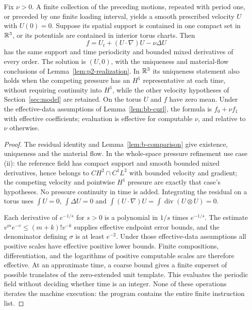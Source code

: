 \begin{proposition}
\label{prop:bb-realization}
Fix $\nu>0$.  A finite collection of the preceding motions, repeated
with period one, or preceded by one finite loading interval, yields a
smooth prescribed velocity $U$ with $U(0)=0$.  Suppose its spatial
support is contained in one compact set in $\mathbb R^3$, or its potentials
are contained in interior torus charts.  Then
\begin{equation}\label{eq:bb-residual}
 f=U_t+(U\cdot\nabla)U-\nu\Delta U
\end{equation}
has the same support and time periodicity and bounded mixed derivatives
of every order.  The solution is $(U,0)$, with the uniqueness and
material-flow conclusions of Lemma~\ref{lem:p2-realization}.
In $\mathbb R^3$ its uniqueness statement also holds when the competing
pressure has an $H^1$ representative at each time, without requiring
continuity into $H^1$, while the other velocity hypotheses of
Section~\ref{sec:model} are retained.  On the torus $U$ and $f$ have
zero mean. Under the effective-data assumptions of Lemma~\ref{lem:bb-curl},
the formula is $f_0+\nu f_1$ with effective coefficients;
evaluation is effective for computable $\nu$, and relative to $\nu$
otherwise.
\end{proposition}
\begin{proof}
The residual identity and Lemma~\ref{lem:b-comparison} give existence,
uniqueness and the material flow.  In the whole-space pressure refinement
use case (ii): the reference field has compact support and smooth bounded
mixed derivatives, hence belongs to $CH^2\cap C^1L^2$ with bounded
velocity and gradient; the competing velocity and pointwise $H^1$
pressure are exactly that case's hypotheses.  No pressure continuity
in time is added.  Integrating the residual on a torus uses
$\int U=0$, $\int\Delta U=0$ and
$\int(U\cdot\nabla)U=\int\operatorname{div}(U\otimes U)=0$.

Each derivative of $e^{-1/s}$ for $s>0$ is a polynomial in $1/s$
times $e^{-1/s}$.  The estimate
$v^m e^{-v}\le(m+k)!v^{-k}$ supplies effective endpoint error bounds,
and the denominator defining $\sigma$ is at least $e^{-2}$.
Under those effective-data assumptions all positive scales have effective
positive lower bounds. Finite
compositions, differentiation, and the logarithms of positive computable
scales are therefore effective.  At an approximate time, a coarse bound
gives a finite superset of possible translates of the zero-extended
unit template.  This evaluates the periodic field without deciding
whether time is an integer.  None of these operations iterates the
machine execution: the program contains the entire finite instruction
list.
\end{proof}

